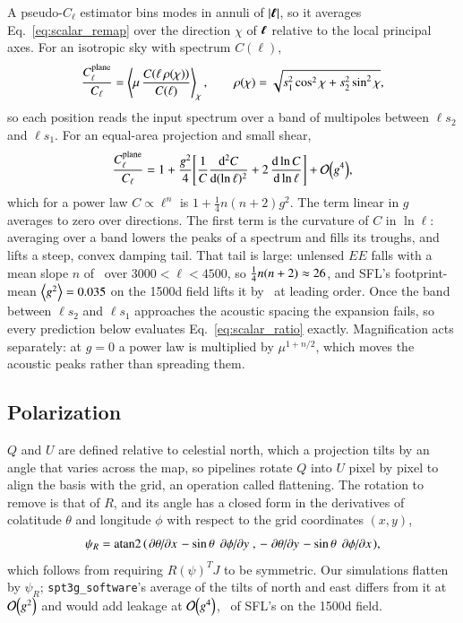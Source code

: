 \documentclass{aa}
\DeclareMathOperator{\atantwo}{atan2}
\newcommand{\vbell}{\vb*{\ell}}
\newcommand{\gsq}{\expval{g^2}}
\begin{document}
A pseudo-$C_\ell$ estimator bins modes in annuli of $\abs{\vbell}$, so it averages Eq.~\eqref{eq:scalar_remap} over the direction $\chi$ of $\vbell$ relative to the local principal axes.
For an isotropic sky with spectrum $C(\ell)$,
\begin{equation} \label{eq:scalar_ratio}
  \frac{C^{\rm plane}_\ell}{C_\ell} = \expval{\mu \, \frac{C\qty(\ell\, \rho(\chi))}{C(\ell)}}_{\chi},
  \qquad \rho(\chi) = \sqrt{s_1^2 \cos^2\chi + s_2^2 \sin^2\chi},
\end{equation}
so each position reads the input spectrum over a band of multipoles between $\ell s_2$ and $\ell s_1$.
For an equal-area projection and small shear,
\begin{equation} \label{eq:scalar_expansion}
  \frac{C^{\rm plane}_\ell}{C_\ell} = 1 + \frac{g^2}{4}\qty[\frac{1}{C}\dv[2]{C}{(\ln\ell)} + 2\,\dv{\ln C}{\ln\ell}] + \order{g^4},
\end{equation}
which for a power law $C \propto \ell^{n}$ is $1 + \tfrac14 n(n+2) g^2$.
The term linear in $g$ averages to zero over directions.
The first term is the curvature of $C$ in $\ln\ell$: averaging over a band lowers the peaks of a spectrum and fills its troughs, and lifts a steep, convex damping tail.
That tail is large: unlensed $EE$ falls with a mean slope $n$ of \nEEtail\ over $3000 < \ell < 4500$, so $\tfrac14 n(n+2) \approx 26$, and SFL's footprint-mean $\gsq = \gsqSFLfield$ on the 1500d field lifts it by \liftEEtailField\ at leading order.
Once the band between $\ell s_2$ and $\ell s_1$ approaches the acoustic spacing the expansion fails, so every prediction below evaluates Eq.~\eqref{eq:scalar_ratio} exactly.
Magnification acts separately: at $g = 0$ a power law is multiplied by $\mu^{1+n/2}$, which moves the acoustic peaks rather than spreading them.

\subsection{Polarization} \label{subsec:derivation}

$Q$ and $U$ are defined relative to celestial north, which a projection tilts by an angle that varies across the map, so pipelines rotate $Q$ into $U$ pixel by pixel to align the basis with the grid, an operation called flattening.
The rotation to remove is that of $R$, and its angle has a closed form in the derivatives of colatitude $\theta$ and longitude $\phi$ with respect to the grid coordinates $(x,y)$,
\begin{equation} \label{eq:polar_angle}
    \psi_R = \atantwo \qty(\pdv*{\theta}{x} - \sin\theta\,\pdv*{\phi}{y},\, -\pdv*{\theta}{y} - \sin\theta\,\pdv*{\phi}{x}),
\end{equation}
which follows from requiring $R(\psi)^{T}J$ to be symmetric.
Our simulations flatten by $\psi_R$; \texttt{spt3g\_software}'s average of the tilts of north and east differs from it at $\order{g^2}$ and would add leakage at $\order{g^4}$, \flattenSFLfield\ of SFL's on the 1500d field.
\end{document}
